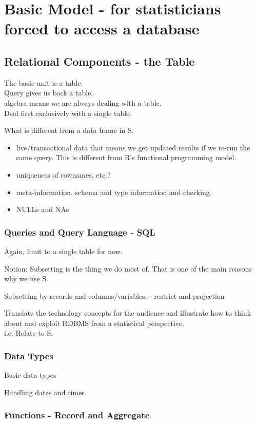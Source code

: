 \documentclass[11pt,timesroman]{article}
\begin{document}
\section{Basic Model - for statisticians forced to access a database}
\subsection{Relational Components - the Table}
 The basic unit is a table.  \\
 Query gives us back a table. \\
 algebra means we are always dealing with a table. \\
 Deal first exclusively with a single table.

 What is different from a data frame in S. 
 \begin{itemize}
 \item live/transactional data that means we get updated results if we 
   re-run the same query.  This is different from R's functional
   programming model.
\item uniqueness of rownames, etc.?
\item meta-information, schema and type information and checking.
\item NULLs and NAs
 \end{itemize}

\subsubsection{Queries and Query Language - SQL}
 Again, limit to a single table for now.

 Notion: Subsetting is the thing we do most of. That is one of the
 main reasons why we use S.

 Subsetting by records and columns/variables. - restrict and projection

 Translate the technology concepts for the audience and illustrate how
 to think about and exploit RDBMS from a statistical perspective. \\
   i.e. Relate to S.


\subsubsection{Data Types}
 Basic data types 
 
 Handling dates and times.

\subsubsection{Functions - Record and Aggregate}
\end{document}
